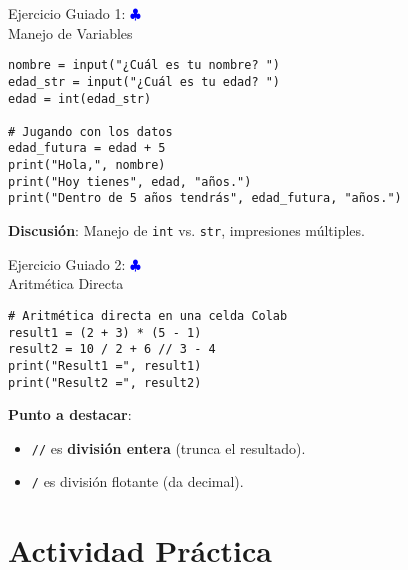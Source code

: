 \documentclass[10pt]{beamer}
\begin{document}
\begin{frame}[fragile]{Ejercicio Guiado 1: \hfill \textcolor{blue}{$\clubsuit$} \\ Manejo de Variables} %
\begin{verbatim}
nombre = input("¿Cuál es tu nombre? ")
edad_str = input("¿Cuál es tu edad? ")
edad = int(edad_str)

# Jugando con los datos
edad_futura = edad + 5
print("Hola,", nombre)
print("Hoy tienes", edad, "años.")
print("Dentro de 5 años tendrás", edad_futura, "años.")
\end{verbatim}
\textbf{Discusión}: Manejo de \texttt{int} vs. \texttt{str}, impresiones múltiples.
\end{frame}

\begin{frame}[fragile]{Ejercicio Guiado 2: \hfill \textcolor{blue}{$\clubsuit$} \\ Aritmética Directa}  %

\begin{verbatim}
# Aritmética directa en una celda Colab
result1 = (2 + 3) * (5 - 1)
result2 = 10 / 2 + 6 // 3 - 4
print("Result1 =", result1)
print("Result2 =", result2)
\end{verbatim}

\textbf{Punto a destacar}:
\begin{itemize}
  \item \texttt{//} es \textbf{división entera} (trunca el resultado).
  \item \texttt{/} es división flotante (da decimal).
\end{itemize}
\end{frame}

\section{Actividad Práctica}
\end{document}
